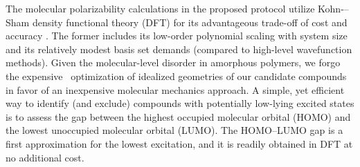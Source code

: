 The molecular polarizability calculations in the proposed protocol utilize Kohn-–Sham density functional theory (DFT) for its advantageous trade-off of cost and accuracy \cite{Neese2009}. The former includes its low-order polynomial scaling with system size and its relatively modest basis set demands (compared to high-level wavefunction methods).
Given the molecular-level disorder in amorphous polymers, we forgo the expensive \firstprinciples\  optimization of idealized geometries of our candidate compounds in favor of an inexpensive molecular mechanics approach. 
A simple, yet efficient way to identify (and exclude) compounds with potentially low-lying excited states is to assess the gap between the highest occupied molecular orbital (HOMO) and the lowest unoccupied molecular orbital (LUMO). The HOMO--LUMO gap is a first approximation for the lowest excitation, and it is readily obtained in DFT at no additional cost.  



